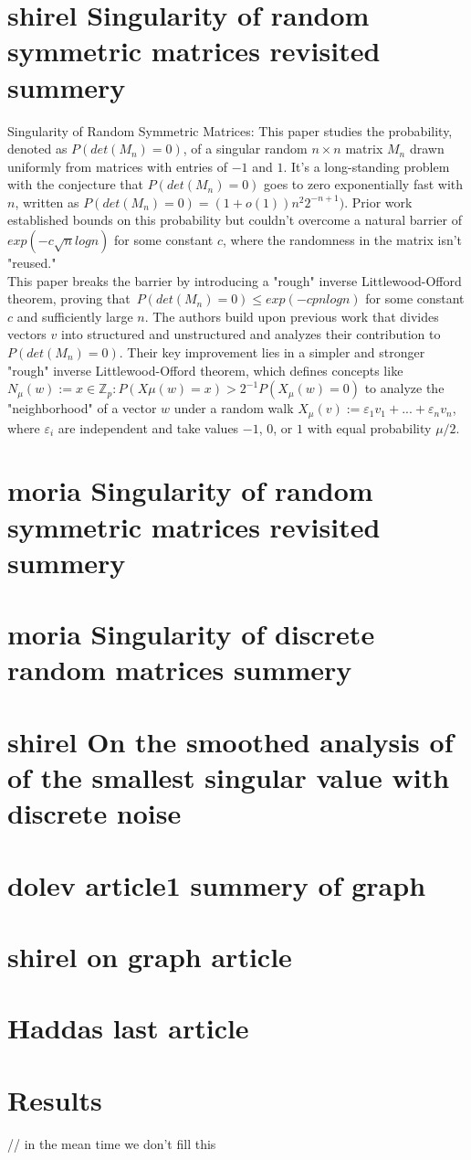\documentclass[12pt]{article}
\begin{document}
\section{shirel Singularity of random symmetric matrices revisited summery}
\begin{flushleft}
Singularity of Random Symmetric Matrices: This paper studies the probability, denoted as ${P(det(M_n) = 0)}$, of a singular random ${n \times n}$ matrix ${M_n}$ drawn uniformly from matrices with entries of ${-1}$ and ${1}$. It's a long-standing problem with the conjecture that ${P(det(M_n) = 0)}$ goes to zero exponentially fast with ${n}$, written as ${P(det(M_n) = 0) = (1 + o(1))n^{2}2^{-n+1})}$. Prior work established bounds on this probability but couldn't overcome a natural barrier of ${exp(-c\sqrt{n} log n)}$ for some constant ${c}$, where the randomness in the matrix isn't "reused."\\
This paper breaks the barrier by introducing a "rough" inverse Littlewood-Offord theorem, proving that\ ${P(det(M_n) = 0) \leq exp(-cpn log n)}$ for some constant ${c}$ and sufficiently large ${n}$. The authors build upon previous work that divides vectors ${v}$ into structured and unstructured and analyzes their contribution to ${P(det(M_n) = 0)}$. Their key improvement lies in a simpler and stronger "rough" inverse Littlewood-Offord theorem, which defines concepts like ${N_{\mu}(w) := {x \in \mathbb{Z}_{p} : P(X \mu (w) = x) > 2^{-1}P(X_{\mu}(w) = 0)}}$ to analyze the "neighborhood" of a vector ${w}$ under a random walk ${X_{\mu}(v) := \varepsilon_1 v_1 + ... + \varepsilon_n v_n}$, where ${\varepsilon_i}$ are independent and take values ${-1}$, ${0}$, or ${1}$ with equal probability ${\mu /2}$.
\end{flushleft}

\section{moria Singularity of random symmetric matrices revisited summery}

\section{moria Singularity of discrete random matrices summery}

\section{shirel On the smoothed analysis of of the smallest singular value with discrete noise}

\section{dolev article1 summery of graph}

\section{shirel on graph article}

\section{Haddas last article}

\section{Results}
// in the mean time we don't fill this
\end{document}
